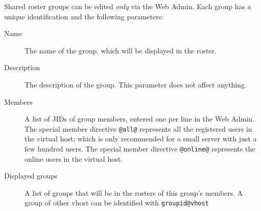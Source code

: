 \documentclass[a4paper,10pt]{book}
\newcommand{\term}[1]{\texttt{#1}}
\begin{document}
Shared roster groups can be edited \emph{only} via the Web Admin. Each group
has a unique identification and the following parameters:
\begin{description}
\item[Name] The name of the group, which will be displayed in the roster.
\item[Description] The description of the group. This parameter does not affect
  anything.
\item[Members] A list of JIDs of group members, entered one per line in
  the Web Admin.
  The special member directive \term{@all@}
  represents all the registered users in the virtual host;
  which is only recommended for a small server with just a few hundred users.
  The special member directive \term{@online@}
  represents the online users in the virtual host.
\item[Displayed groups]
  A list of groups that will be in the rosters of this group's members.
  A group of other vhost can be identified with \term{groupid@vhost}
\end{description}
\end{document}
